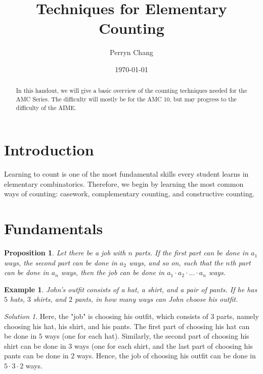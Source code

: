 \documentclass[letterpaper]{article}
\title{Techniques for Elementary Counting}
\author{Perryn Chang}
\date{\today}
\newtheorem{prop}[thm]{Proposition}
\newtheorem{example}[thm]{Example}
\theoremstyle{remark}
\newtheorem*{solution}{Solution}
\begin{document}
\maketitle

\begin{abstract}
In this handout, we will give a basic overview of the counting techniques needed for the AMC Series. The difficulty will mostly be for the AMC 10, but may progress to the difficulty of the AIME.
\end{abstract}

\section{Introduction}

Learning to count is one of the most fundamental skills every student learns in elementary combinatorics. Therefore, we begin by learning the most common ways of counting: casework, complementary counting, and constructive counting.

\section{Fundamentals}
\label{sec:examples}

\begin{prop}
Let there be a job with $n$ parts. If the first part can be done in $a_1$ ways, the second part can be done in $a_2$ ways, and so on, such that the $n$th part can be done in $a_n$ ways, then the job can be done in $a_1 \cdot a_2 \cdot \dots \cdot a_n$ ways.

\end{prop}

\begin{example}

John's outfit consists of a hat, a shirt, and a pair of pants. If he has $5$ hats, $3$ shirts, and $2$ pants, in how many ways can John choose his outfit.

\end{example}

\begin{solution}

Here, the "job" is choosing his outfit, which consists of $3$ parts, namely choosing his hat, his shirt, and his pants. The first part of choosing his hat can be done in $5$ ways (one for each hat). Similarly, the second part of choosing his shirt can be done in $3$ ways (one for each shirt, and the last part of choosing his pants can be done in $2$ ways. Hence, the job of choosing his outfit can be done in $5\cdot 3 \cdot 2$ ways.
\end{solution}
\end{document}
